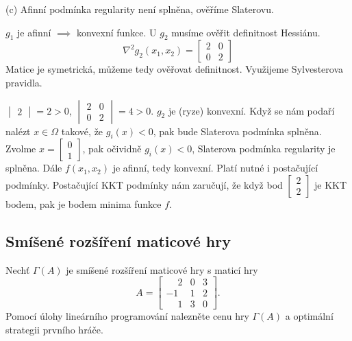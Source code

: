 (c)
Afinní podmínka regularity není splněna, ověříme Slaterovu.

$g_1$ je afinní $\implies$ konvexní funkce. U $g_2$ musíme ověřit definitnost Hessiánu.
\[
    \nabla^2 g_2(x_1, x_2) = 
    \begin{bmatrix}
        2 & 0 \\
        0 & 2
    \end{bmatrix}
\]
Matice je symetrická, můžeme tedy ověřovat definitnost. Využijeme Sylvesterova pravidla.

$\begin{vmatrix}
    2
\end{vmatrix} = 2 > 0$, $
\begin{vmatrix}
    2 & 0 \\
    0 & 2    
\end{vmatrix} = 4 > 0$. $g_2$ je (ryze) konvexní. Když se nám podaří nalézt $x \in \Omega$ takové, že $g_i(x) < 0$, pak 
bude Slaterova podmínka splněna. Zvolme $x = \begin{bmatrix} 0 \\ 1 \end{bmatrix}$, pak očividně $g_i(x) < 0$, Slaterova
podmínka regularity je splněna. Dále $f(x_1, x_2)$ je afinní, tedy konvexní. Platí nutné i postačující podmínky. 
Postačující KKT podmínky nám zaručují, že když bod $\begin{bmatrix}2 \\ 2\end{bmatrix}$ je KKT bodem, pak je bodem 
minima funkce $f$.

\subsection{Smíšené rozšíření maticové hry}
Nechť $\Gamma(A)$ je smíšené rozšíření maticové hry s maticí hry
\[
    A = 
    \begin{bmatrix}
        \phantom{-}2 & 0 & 3 \\
        -1 & 1 & 2 \\
        \phantom{-}1 & 3 & 0
    \end{bmatrix}.
\]
Pomocí úlohy lineárního programování nalezněte cenu hry $\Gamma(A)$ a optimální strategii prvního hráče.

